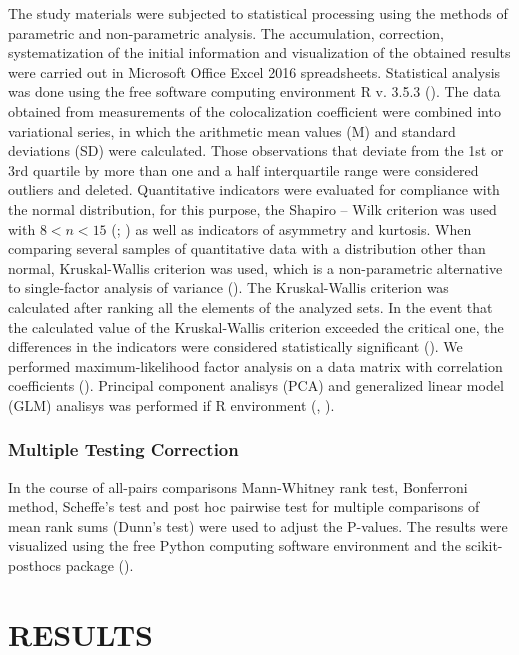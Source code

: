 \documentclass[english,authoryear]{elsarticle}
\begin{document}
The study materials were subjected to statistical processing using the methods of parametric and non-parametric analysis.
The accumulation, correction, systematization of the initial information and visualization of the obtained results were carried out in Microsoft Office Excel 2016 spreadsheets.
Statistical analysis was done using the free software computing environment R v. 3.5.3 (\cite{team2014r}).
The data obtained from measurements of the colocalization coefficient were combined into variational series, in which the arithmetic mean values (M) and standard deviations (SD) were calculated.
Those observations that deviate from the 1st or 3rd quartile by more than one and a half interquartile range were considered outliers and deleted.
Quantitative indicators were evaluated for compliance with the normal distribution, for this purpose, the Shapiro – Wilk criterion  was used with $8 < n < 15$ (\cite{shapiro1965analysis}; \cite{shapiro1972approximate}) as well as indicators of asymmetry and kurtosis.
When comparing several samples of quantitative data with a distribution other than normal, Kruskal-Wallis criterion was used, which is a non-parametric alternative to single-factor analysis of variance (\cite{kruskal1952use}).
The Kruskal-Wallis criterion was calculated after ranking all the elements of the analyzed sets.
In the event that the calculated value of the Kruskal-Wallis criterion exceeded the critical one, the differences in the indicators were considered statistically significant (\cite{wilcoxon1992individual}).
We performed maximum-likelihood factor analysis on a data matrix with correlation coefficients (\cite{lawley1971factor}).
Principal component analisys (PCA)  and generalized linear model (GLM) analisys was performed if R environment (\cite{husson2010exploratory}, \cite{dobson2008introduction}).


\subsubsection{Multiple Testing Correction}

In the course of all-pairs comparisons Mann-Whitney rank test, Bonferroni method, Scheffe’s test and post hoc pairwise test for multiple comparisons of mean rank sums (Dunn’s test) were used to adjust the P-values. The results were visualized using the free Python computing software environment and the scikit-posthocs package (\cite{Terpilowski2019}).


\section{RESULTS}
\end{document}
